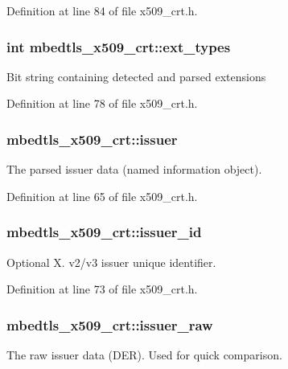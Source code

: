 Definition at line 84 of file x509\-\_\-crt.\-h.

\hypertarget{structmbedtls__x509__crt_a60878e1cb7a3058f19042d8f189158b0}{
\subsubsection[{ext\-\_\-types}]{\setlength{\rightskip}{0pt plus 5cm}int mbedtls\-\_\-x509\-\_\-crt\-::ext\-\_\-types}}\label{structmbedtls__x509__crt_a60878e1cb7a3058f19042d8f189158b0}
Bit string containing detected and parsed extensions 

Definition at line 78 of file x509\-\_\-crt.\-h.

\hypertarget{structmbedtls__x509__crt_ade48d67edd24629e28361d3fbc0aafd9}{
\subsubsection[{issuer}]{ mbedtls\-\_\-x509\-\_\-crt\-::issuer}}\label{structmbedtls__x509__crt_ade48d67edd24629e28361d3fbc0aafd9}
The parsed issuer data (named information object). 

Definition at line 65 of file x509\-\_\-crt.\-h.

\hypertarget{structmbedtls__x509__crt_a6bb2a7142b718fa43b948770ccc98dcd}{
\subsubsection[{issuer\-\_\-id}]{ mbedtls\-\_\-x509\-\_\-crt\-::issuer\-\_\-id}}\label{structmbedtls__x509__crt_a6bb2a7142b718fa43b948770ccc98dcd}
Optional X. v2/v3 issuer unique identifier. 

Definition at line 73 of file x509\-\_\-crt.\-h.

\hypertarget{structmbedtls__x509__crt_afb876a6a7b85e160620c4549324d9e8d}{
\subsubsection[{issuer\-\_\-raw}]{ mbedtls\-\_\-x509\-\_\-crt\-::issuer\-\_\-raw}}\label{structmbedtls__x509__crt_afb876a6a7b85e160620c4549324d9e8d}
The raw issuer data (D\-E\-R). Used for quick comparison. 

